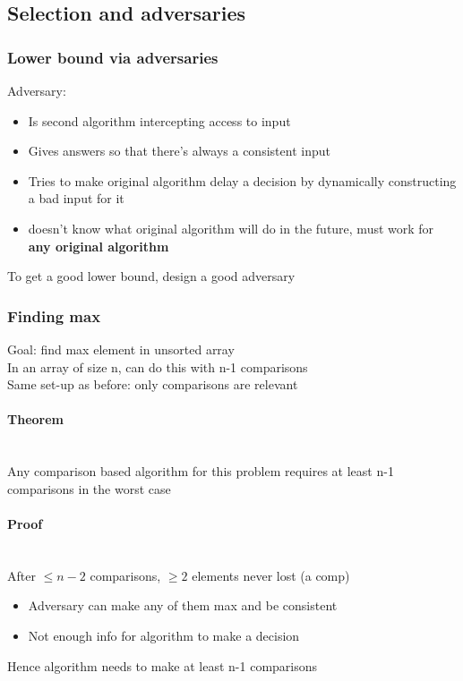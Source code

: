 \documentclass{article}[18pt]
\begin{document}
\subsection{Selection and adversaries}
\subsubsection{Lower bound via adversaries}
Adversary:
\begin{itemize}
\item Is second algorithm intercepting access to input
\item Gives answers so that there's always a consistent input
\item Tries to make original algorithm delay a decision by dynamically constructing a bad input for it
\item doesn't know what original algorithm will do in the future, must work for \textbf{any original algorithm}
\end{itemize}
To get a good lower bound, design a good adversary
\subsubsection{Finding max}
Goal: find max element in unsorted array\\
In an array of size n, can do this with n-1 comparisons\\
Same set-up as before: only comparisons are relevant
\paragraph{Theorem}
$ $\\
Any comparison based algorithm for this problem requires at least n-1 comparisons in the worst case
\paragraph{Proof}
$ $\\
After $\leqslant n-2$ comparisons, $\geqslant 2$ elements never lost (a comp)
\begin{itemize}
\item Adversary can make any of them max and be consistent
\item Not enough info for algorithm to make a decision
\end{itemize}
Hence algorithm needs to make at least n-1 comparisons
\end{document}
